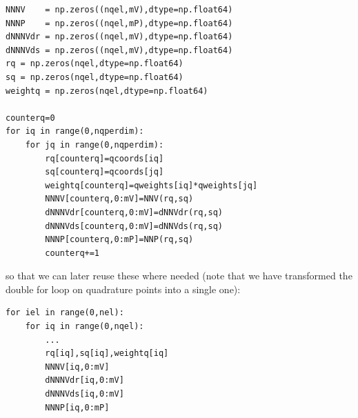 \begin{lstlisting}
NNNV    = np.zeros((nqel,mV),dtype=np.float64) 
NNNP    = np.zeros((nqel,mP),dtype=np.float64) 
dNNNVdr = np.zeros((nqel,mV),dtype=np.float64) 
dNNNVds = np.zeros((nqel,mV),dtype=np.float64) 
rq = np.zeros(nqel,dtype=np.float64) 
sq = np.zeros(nqel,dtype=np.float64) 
weightq = np.zeros(nqel,dtype=np.float64) 
   
counterq=0 
for iq in range(0,nqperdim):
    for jq in range(0,nqperdim):
        rq[counterq]=qcoords[iq]
        sq[counterq]=qcoords[jq]
        weightq[counterq]=qweights[iq]*qweights[jq]
        NNNV[counterq,0:mV]=NNV(rq,sq)
        dNNNVdr[counterq,0:mV]=dNNVdr(rq,sq)
        dNNNVds[counterq,0:mV]=dNNVds(rq,sq)
        NNNP[counterq,0:mP]=NNP(rq,sq)
        counterq+=1
\end{lstlisting}
so that we can later reuse these where needed (note that we have transformed the 
double for loop on quadrature points into a single one):
\begin{lstlisting}
for iel in range(0,nel):
    for iq in range(0,nqel):
        ...
        rq[iq],sq[iq],weightq[iq]
        NNNV[iq,0:mV]
        dNNNVdr[iq,0:mV]
        dNNNVds[iq,0:mV]
        NNNP[iq,0:mP]
\end{lstlisting}

